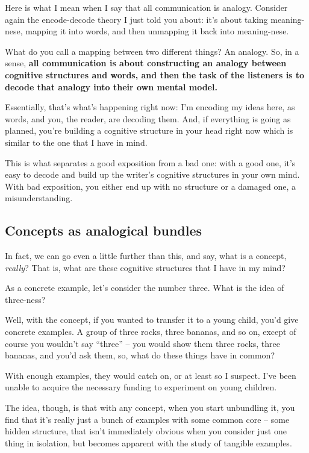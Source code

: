 Here is what I mean when I say that all communication is analogy.
Consider again the encode-decode theory I just told you about: it's
about taking meaning-nese, mapping it into words, and then unmapping it
back into meaning-nese.

What do you call a mapping between two different things? An analogy. So,
in a sense, \textbf{all communication is about constructing an analogy
between cognitive structures and words, and then the task of the
listeners is to decode that analogy into their own mental model.}

Essentially, that's what's happening right now: I'm encoding my ideas
here, as words, and you, the reader, are decoding them. And, if
everything is going as planned, you're building a cognitive structure in
your head right now which is similar to the one that I have in mind.

This is what separates a good exposition from a bad one: with a good
one, it's easy to decode and build up the writer's cognitive structures
in your own mind. With bad exposition, you either end up with no
structure or a damaged one, a misunderstanding.

\subsection{Concepts as analogical
bundles}\label{concepts-as-analogical-bundles}

In fact, we can go even a little further than this, and say, what is a
concept, \emph{really}? That is, what are these cognitive structures
that I have in my mind?

As a concrete example, let's consider the number three. What is the idea
of three-ness?

Well, with the concept, if you wanted to transfer it to a young child,
you'd give concrete examples. A group of three rocks, three bananas, and
so on, except of course you wouldn't say ``three'' -- you would show
them three rocks, three bananas, and you'd ask them, so, what do these
things have in common?

With enough examples, they would catch on, or at least so I suspect.
I've been unable to acquire the necessary funding to experiment on young
children.

The idea, though, is that with any concept, when you start unbundling
it, you find that it's really just a bunch of examples with some common
core -- some hidden structure, that isn't immediately obvious when you
consider just one thing in isolation, but becomes apparent with the
study of tangible examples.

